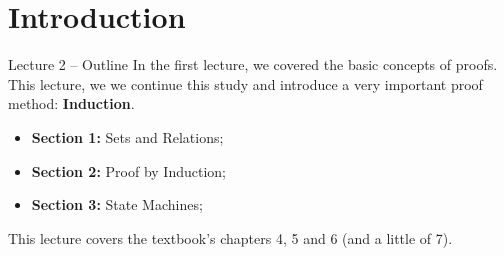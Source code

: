 \section{Introduction}

\begin{frame}{Lecture 2 -- Outline}
  In the first lecture, we covered the basic concepts of proofs. This lecture, we we continue this study and introduce a very important proof method: {\bf Induction}.
  \bigskip

  \begin{itemize}
    \item {\bf Section 1:} Sets and Relations;
    \item {\bf Section 2:} Proof by Induction;
    \item {\bf Section 3:} State Machines;
  \end{itemize}


  \bigskip
  \begin{block}{}
  This lecture covers the textbook's chapters 4, 5 and 6 (and a little of 7).
  \end{block}
\end{frame}
